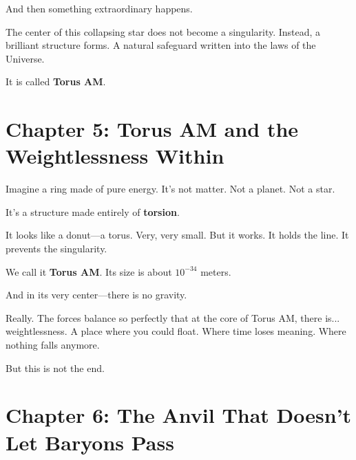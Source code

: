 \documentclass{article}
\begin{document}
\vspace{1ex}
\noindent
And then something extraordinary happens.

\vspace{1ex}
\noindent
The center of this collapsing star does not become a singularity.  
Instead, a brilliant structure forms.  
A natural safeguard written into the laws of the Universe.

\vspace{1ex}
\noindent
It is called \textbf{Torus AM}.



\section*{Chapter 5: Torus AM and the Weightlessness Within}

\noindent
Imagine a ring made of pure energy.  
It’s not matter.  
Not a planet. Not a star.  

\vspace{1ex}
\noindent
It’s a structure made entirely of \textbf{torsion}.

\vspace{1ex}
\noindent
It looks like a donut—a torus.  
Very, very small.  
But it works.  
It holds the line.  
It prevents the singularity.

\vspace{1ex}
\noindent
We call it \textbf{Torus AM}.  
Its size is about $10^{-34}$ meters.

\vspace{1ex}
\noindent
And in its very center—there is no gravity.

\vspace{1ex}
\noindent
Really.  
The forces balance so perfectly that at the core of Torus AM, there is... weightlessness.  
A place where you could float.  
Where time loses meaning.  
Where nothing falls anymore.

\vspace{1ex}
\noindent
But this is not the end.




\section*{Chapter 6: The Anvil That Doesn’t Let Baryons Pass}
\end{document}
